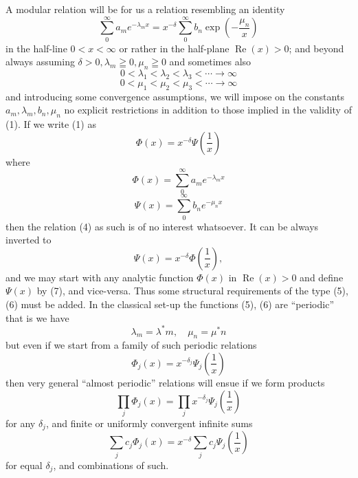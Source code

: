\documentclass[12pt]{article}
\begin{document}
A modular relation will be for us a relation resembling an identity
\begin{equation}
\sum_{0}^{\infty} a_m e^{-\lambda_m x} = x^{-\delta} \sum_{0}^{\infty} b_n \exp \left( -\frac{\mu_n}{x} \right)
\tag{1}
\end{equation}
in the half-line \(0 < x < \infty\) or rather in the half-plane \(\operatorname{Re}(x) > 0\); and beyond always assuming \(\delta > 0, \lambda_m \geqq 0, \mu_n \geqq 0\) and sometimes also
\begin{equation}
0 < \lambda_1 < \lambda_2 < \lambda_3 < \cdots \to \infty
\tag{2}
\end{equation}
\begin{equation}
0 < \mu_1 < \mu_2 < \mu_3 < \cdots \to \infty
\tag{3}
\end{equation}
and introducing some convergence assumptions, we will impose on the constants \(a_m, \lambda_m, b_n, \mu_n\) no explicit restrictions in addition to those implied in the validity of (1). If we write (1) as
\begin{equation}
\Phi(x) = x^{-\delta} \Psi \left( \frac{1}{x} \right)
\tag{4}
\end{equation}
where
\begin{equation}
\Phi(x) = \sum_{0}^{\infty} a_m e^{-\lambda_m x}
\tag{5}
\end{equation}
\begin{equation}
\Psi(x) = \sum_{0}^{\infty} b_n e^{-\mu_n x}
\tag{6}
\end{equation}
then the relation (4) as such is of no interest whatsoever. It can be always inverted to
\begin{equation}
\Psi(x) = x^{-\delta} \Phi \left( \frac{1}{x} \right),
\tag{7}
\end{equation}
and we may start with any analytic function \(\Phi(x)\) in \(\operatorname{Re}(x) > 0\) and define \(\Psi(x)\) by (7), and vice-versa. Thus some structural requirements of the type (5), (6) must be added. In the classical set-up the functions (5), (6) are ``periodic'' that is we have
\begin{equation}
\lambda_m = \lambda^* m, \quad \mu_n = \mu^* n
\tag{8}
\end{equation}
but even if we start from a family of such periodic relations
\[
\Phi_j(x) = x^{-\delta_j} \Psi_j \left( \frac{1}{x} \right)
\]
then very general ``almost periodic'' relations will ensue if we form products
\[
\prod_j \Phi_j(x) = \prod_j x^{-\delta_j} \Psi_j \left( \frac{1}{x} \right)
\]
for any \(\delta_j\), and finite or uniformly convergent infinite sums
\[
\sum_j c_j \Phi_j(x) = x^{-\delta} \sum_j c_j \Psi_j \left( \frac{1}{x} \right)
\]
for equal \(\delta_j\), and combinations of such.
\end{document}
